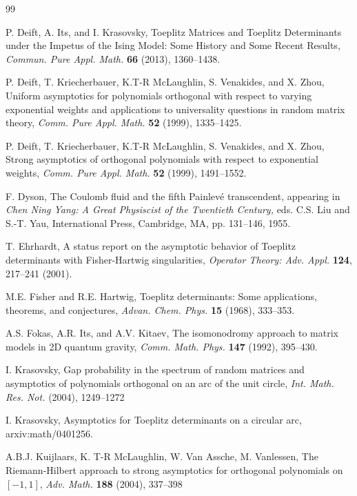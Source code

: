 \documentclass[11pt,fleqn]{article}
\numberwithin{equation}{section}
\begin{document}
\begin{thebibliography}{99}

 P. Deift, A. Its, and I. Krasovsky,
Toeplitz Matrices and Toeplitz Determinants under the Impetus of the Ising Model: Some History and Some Recent Results, {\em Commun. Pure Appl. Math.} {\bf 66} (2013), 1360--1438.

    P. Deift, T. Kriecherbauer, K.T-R McLaughlin, S. Venakides, and X. Zhou,
    Uniform asymptotics for polynomials orthogonal with respect to
    varying exponential weights and applications to universality
    questions in random matrix theory,
    {\em Comm. Pure Appl. Math.} {\bf 52} (1999), 1335--1425.
    
    P. Deift, T. Kriecherbauer, K.T-R McLaughlin, S. Venakides,
    and X. Zhou,
    Strong asymptotics of orthogonal polynomials with respect to
    exponential weights,
    {\em Comm. Pure Appl. Math.} {\bf 52} (1999), 1491--1552.
    
 F. Dyson, The Coulomb fluid and the fifth Painlev\'e transcendent, appearing in {\em Chen Ning Yang: A Great Physiscist of the Twentieth Century,} eds. C.S. Liu and S.-T. Yau, International Press, Cambridge, MA, pp. 131--146, 1955.

 T. Ehrhardt, A status report on the asymptotic behavior of Toeplitz
determinants with Fisher-Hartwig singularities, {\em Operator
Theory: Adv. Appl.} {\bf 124}, 217--241 (2001).


 M.E. Fisher and R.E. Hartwig, Toeplitz determinants: Some applications, theorems, and conjectures,
{\em Advan. Chem. Phys.} {\bf 15} (1968), 333--353.

    A.S. Fokas, A.R. Its, and A.V. Kitaev,
    The isomonodromy approach to matrix models in 2D quantum gravity,
    {\em Comm. Math. Phys.} {\bf 147} (1992), 395--430.

 I. Krasovsky,
Gap probability in the spectrum of random matrices and asymptotics of polynomials orthogonal on an arc of the unit circle, \textit{Int. Math. Res. Not.} (2004), 1249--1272

 I. Krasovsky, Asymptotics for Toeplitz determinants on a circular arc, arxiv:math/0401256.

 A.B.J. Kuijlaars, K. T-R McLaughlin, W. Van Assche, M. Vanlessen, The Riemann-Hilbert approach to strong asymptotics for orthogonal polynomials on $[-1,1]$, \textit{Adv. Math.} \textbf{188} (2004), 337--398


\end{thebibliography}
\end{document}
